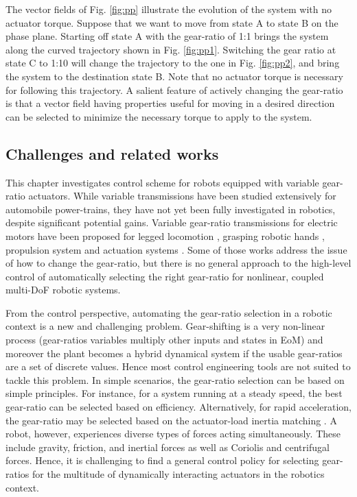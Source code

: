 The vector fields of Fig. \ref{fig:pp} illustrate the evolution of the system with no actuator torque. Suppose that we want to move from state A to state B on the phase plane. Starting off state A with the gear-ratio of 1:1 brings the system along the curved trajectory shown in Fig. \ref{fig:pp1}. Switching the gear ratio at state C to 1:10 will change the trajectory to the one in Fig. \ref{fig:pp2}, and bring the system to the destination state B. Note that no actuator torque is necessary for following this trajectory. A salient feature of actively changing the gear-ratio is that a vector field having properties useful for moving in a desired direction can be selected to minimize the necessary torque to apply to the system. 


\subsection{Challenges and related works}
\label{sec:chal}

This chapter investigates control scheme for robots equipped with variable gear-ratio actuators. While variable transmissions have been studied extensively for automobile power-trains, they have not yet been fully investigated in robotics, despite significant potential gains. Variable gear-ratio transmissions for electric motors have been proposed for legged locomotion \cite{hirose_design_1991}, grasping robotic hands \cite{shin_robot_2012} , propulsion system \cite{lee_new_2012} \cite{mckeegan_antonovs_2011} and actuation systems \cite{girard_two-speed_2015} \cite{hirose_development_1999} \cite{tahara_high-backdrivable_2011}. Some of those works address the issue of how to change the gear-ratio, but there is no general approach to the high-level control of automatically selecting the right gear-ratio for nonlinear, coupled multi-DoF robotic systems.

From the control perspective, automating the gear-ratio selection in a robotic context is a new and challenging problem. Gear-shifting is a very non-linear process (gear-ratios variables multiply other inputs and states in EoM) and moreover the plant becomes a hybrid dynamical system if the usable gear-ratios are a set of discrete values. Hence most control engineering tools are not suited to tackle this problem. In simple scenarios, the gear-ratio selection can be based on simple principles. For instance, for a system running at a steady speed, the best gear-ratio can be selected based on efficiency. Alternatively, for rapid acceleration, the gear-ratio may be selected based on the actuator-load inertia matching \cite{giberti_effects_2010} \cite{chen_generalized_1991}. A robot, however, experiences diverse types of forces acting simultaneously. These include gravity, friction, and inertial forces as well as Coriolis and centrifugal forces. Hence, it is challenging to find a general control policy for selecting gear-ratios for the multitude of dynamically interacting actuators in the robotics context. 

